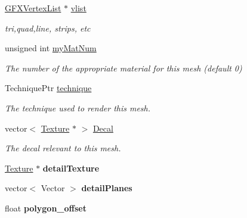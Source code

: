 \begin{DoxyCompactItemize}
\item 
\hyperlink{classGFXVertexList}{G\+F\+X\+Vertex\+List} $\ast$ \hyperlink{classMesh_a0e27151a7b15d599c15b6cc2eb688e88}{vlist}\hypertarget{classMesh_a0e27151a7b15d599c15b6cc2eb688e88}{}\label{classMesh_a0e27151a7b15d599c15b6cc2eb688e88}

\begin{DoxyCompactList}\small\item\em tri,quad,line, strips, etc \end{DoxyCompactList}\item 
unsigned int \hyperlink{classMesh_a2ee510acbee55ec88c2f92de7afcc634}{my\+Mat\+Num}\hypertarget{classMesh_a2ee510acbee55ec88c2f92de7afcc634}{}\label{classMesh_a2ee510acbee55ec88c2f92de7afcc634}

\begin{DoxyCompactList}\small\item\em The number of the appropriate material for this mesh (default 0) \end{DoxyCompactList}\item 
Technique\+Ptr \hyperlink{classMesh_a987e568f336befda6be200200a92509b}{technique}\hypertarget{classMesh_a987e568f336befda6be200200a92509b}{}\label{classMesh_a987e568f336befda6be200200a92509b}

\begin{DoxyCompactList}\small\item\em The technique used to render this mesh. \end{DoxyCompactList}\item 
vector$<$ \hyperlink{classTexture}{Texture} $\ast$ $>$ \hyperlink{classMesh_a3f784ffd86f77379da8e04890843ce49}{Decal}\hypertarget{classMesh_a3f784ffd86f77379da8e04890843ce49}{}\label{classMesh_a3f784ffd86f77379da8e04890843ce49}

\begin{DoxyCompactList}\small\item\em The decal relevant to this mesh. \end{DoxyCompactList}\item 
\hyperlink{classTexture}{Texture} $\ast$ {\bfseries detail\+Texture}\hypertarget{classMesh_afdb9b8b69db3b694c7298d4eaefa8344}{}\label{classMesh_afdb9b8b69db3b694c7298d4eaefa8344}

\item 
vector$<$ Vector $>$ {\bfseries detail\+Planes}\hypertarget{classMesh_a41e90e4c18120601651f117a3b37b100}{}\label{classMesh_a41e90e4c18120601651f117a3b37b100}

\item 
float {\bfseries polygon\+\_\+offset}\hypertarget{classMesh_a8dd82dc2d5a77f5eaa67cee428617ea7}{}\label{classMesh_a8dd82dc2d5a77f5eaa67cee428617ea7}


\end{DoxyCompactItemize}
